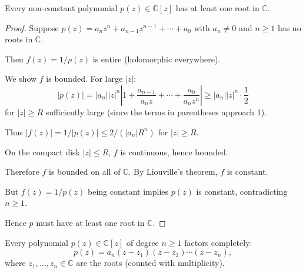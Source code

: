 \begin{theorem}
  Every non-constant polynomial $p(z) \in \mathbb{C}[z]$ has at least one root in $\mathbb{C}$.
\end{theorem}

\begin{center}
\end{center}

\begin{proof}
  Suppose $p(z) = a_n z^n + a_{n-1} z^{n-1} + \cdots + a_0$ with $a_n \neq 0$ and $n \geq 1$ has no roots in $\mathbb{C}$.

  Then $f(z) = 1/p(z)$ is entire (holomorphic everywhere).

  We show $f$ is bounded. For large $|z|$:
  \[
    |p(z)| = |a_n| |z|^n \left| 1 + \frac{a_{n-1}}{a_n z} + \cdots + \frac{a_0}{a_n z^n} \right| \geq |a_n| |z|^n \cdot \frac{1}{2}
  \]
  for $|z| \geq R$ sufficiently large (since the terms in parentheses approach 1).

  Thus $|f(z)| = 1/|p(z)| \leq 2/(|a_n| R^n)$ for $|z| \geq R$.

  On the compact disk $|z| \leq R$, $f$ is continuous, hence bounded.

  Therefore $f$ is bounded on all of $\mathbb{C}$. By Liouville's theorem, $f$ is constant.

  But $f(z) = 1/p(z)$ being constant implies $p(z)$ is constant, contradicting $n \geq 1$.

  Hence $p$ must have at least one root in $\mathbb{C}$.
\end{proof}

\begin{corollary}
  Every polynomial $p(z) \in \mathbb{C}[z]$ of degree $n \geq 1$ factors completely:
  \[
    p(z) = a_n (z - z_1)(z - z_2) \cdots (z - z_n),
  \]
  where $z_1, \ldots, z_n \in \mathbb{C}$ are the roots (counted with multiplicity).
\end{corollary}

